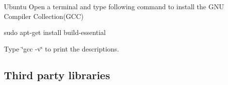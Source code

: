 \begin{DoxyParagraph}{Ubuntu}
Open a terminal and type following command to install the G\+N\+U Compiler Collection(\+G\+C\+C) \cite{gcc} 
\begin{DoxyCode}
sudo apt-\textcolor{keyword}{get} install build-essential
\end{DoxyCode}
 Type \char`\"{}gcc -\/v\char`\"{} to print the descriptions. 

\end{DoxyParagraph}
\hypertarget{_conformanceto_specificationand_design_manual_SetupDevelopmentEnvironmentThirdpartylibraries}{}\subsection{Third party libraries}\label{_conformanceto_specificationand_design_manual_SetupDevelopmentEnvironmentThirdpartylibraries}
